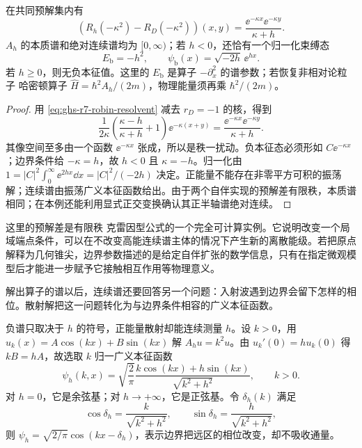 \begin{proposition}[秩一预解差与唯一束缚态]\label{prop:ghs-r7-robin-krein}
在共同预解集内有
\begin{equation}\label{eq:ghs-r7-robin-rank-one}
 (R_h(-\kappa^2)-R_D(-\kappa^2))(x,y)
 =\frac{\ee^{-\kappa x}\ee^{-\kappa y}}{\kappa+h}.
\end{equation}
$A_h$ 的本质谱和绝对连续谱均为 $[0,\infty)$；若 $h<0$，还恰有一个归一化束缚态
\begin{equation}\label{eq:ghs-r7-robin-bound-state}
 E_{\mathrm b}=-h^2,\qquad
 \psi_{\mathrm b}(x)=\sqrt{-2h}\,\ee^{hx}.
\end{equation}
若 $h\ge0$，则无负本征值。这里的 $E_{\mathrm b}$ 是算子 $-\partial_x^2$ 的谱参数；若恢复非相对论粒子 哈密顿算子 $\widehat H=\hbar^2 A_h/(2m)$，物理能量须再乘 $\hbar^2/(2m)$。
\end{proposition}
\begin{proof}
用 \cref{eq:ghs-r7-robin-resolvent} 减去 $r_D=-1$ 的核，得到
\[
 \frac{1}{2\kappa}\left(\frac{\kappa-h}{\kappa+h}+1\right)
 \ee^{-\kappa(x+y)}=\frac{\ee^{-\kappa x}\ee^{-\kappa y}}{\kappa+h}.
\]
其像空间至多由一个函数 $\ee^{-\kappa x}$ 张成，所以是秩一扰动。负本征态必须形如 $C\ee^{-\kappa x}$；边界条件给 $-\kappa=h$，故 $h<0$ 且 $\kappa=-h$。归一化由 $1=|C|^2\int_0^\infty\ee^{2hx}\dd x=|C|^2/(-2h)$ 决定。正能量不能存在非零平方可积的振荡解；连续谱由振荡广义本征函数给出。由于两个自伴实现的预解差有限秩，本质谱相同；在本例还能利用显式正交变换确认其正半轴谱绝对连续。
\end{proof}

这里的预解差是有限秩 克雷因型公式的一个完全可计算实例。它说明改变一个局域端点条件，可以在不改变高能连续谱主体的情况下产生新的离散能级。若把原点解释为几何锥尖，边界参数描述的是给定自伴扩张的数学信息，只有在指定微观模型后才能进一步赋予它接触相互作用等物理意义。

解出算子的谱以后，连续谱还要回答另一个问题：入射波遇到边界会留下怎样的相位。散射解把这一问题转化为与边界条件相容的广义本征函数。

负谱只取决于 $h$ 的符号，正能量散射却能连续测量 $h$。设 $k>0$，用 $u_k(x)=A\cos(kx)+B\sin(kx)$ 解 $A_hu=k^2u$。由 $u_k'(0)=h u_k(0)$ 得 $kB=hA$，故选取 $k$ 归一广义本征函数
\begin{equation}\label{eq:ghs-r7-robin-generalized}
 \psi_h(k,x)=\sqrt{\frac{2}{\pi}}
 \frac{k\cos(kx)+h\sin(kx)}{\sqrt{k^2+h^2}},\qquad k>0.
\end{equation}
对 $h=0$，它是余弦基；对 $h\to+\infty$，它是正弦基。令 $\delta_h(k)$ 满足
\[
 \cos\delta_h=\frac{k}{\sqrt{k^2+h^2}},\qquad
 \sin\delta_h=\frac{h}{\sqrt{k^2+h^2}},
\]
则 $\psi_h=\sqrt{2/\pi}\cos(kx-\delta_h)$，表示边界把远区的相位改变，却不吸收通量。


